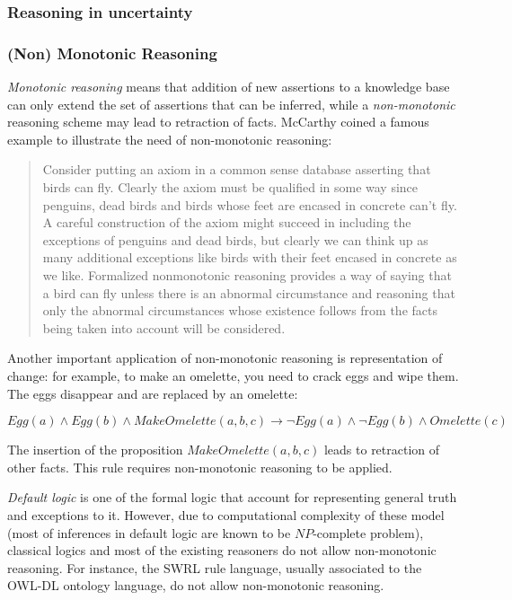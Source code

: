 \documentclass[a4paper, twocolumn]{article}
\begin{document}
\subsubsection{Reasoning in uncertainty}


\subsubsection{(Non) Monotonic Reasoning}

\emph{Monotonic reasoning} means that addition of new assertions to a knowledge base
can only extend the set of assertions that can be inferred, while a
\emph{non-monotonic} reasoning scheme may lead to retraction of facts.
McCarthy coined a famous example to illustrate the need of non-monotonic reasoning:

\begin{quotation}
Consider putting an axiom in a common sense database asserting that birds can
fly. Clearly the axiom must be qualified in some way since penguins, dead birds
and birds whose feet are encased in concrete can't fly. A careful construction
of the axiom might succeed in including the exceptions of penguins and dead
birds, but clearly we can think up as many additional exceptions like birds
with their feet encased in concrete as we like. Formalized nonmonotonic
reasoning provides a way of saying that a bird can fly unless there
is an abnormal circumstance and reasoning that only the abnormal circumstances
whose existence follows from the facts being taken into account will be
considered.
\end{quotation}

Another important application of non-monotonic reasoning is representation of
change: for example, to make an omelette, you need to crack eggs and wipe them.
The eggs disappear and are replaced by an omelette:

$Egg(a) \wedge Egg(b) \wedge MakeOmelette(a, b, c) \to \lnot Egg(a) \wedge
\lnot Egg(b) \wedge Omelette(c)$

The insertion of the proposition $MakeOmelette(a, b, c)$ leads to retraction of
other facts. This rule requires non-monotonic reasoning to be applied.

\emph{Default logic} is one of the formal logic that account for representing
general truth and exceptions to it. However, due to computational complexity of
these model (most of inferences in default logic are known to be $NP$-complete
problem), classical logics and most of the existing reasoners do not allow
non-monotonic reasoning. For instance, the SWRL rule language, usually
associated to the OWL-DL ontology language, do not allow non-monotonic
reasoning.
\end{document}
